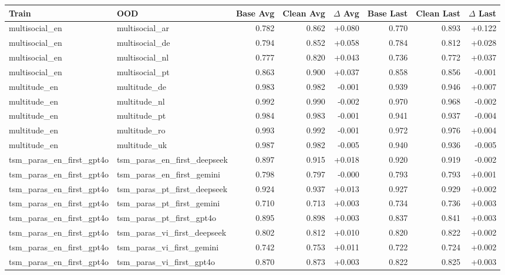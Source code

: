 \begin{table}[t]
\centering
\small
\begin{tabular}{llrrrrrr}
\hline
Train & OOD & Base Avg & Clean Avg & $\Delta$ Avg & Base Last & Clean Last & $\Delta$ Last \\
\hline
multisocial\_en & multisocial\_ar & 0.782 & 0.862 & +0.080 & 0.770 & 0.893 & +0.122 \\
multisocial\_en & multisocial\_de & 0.794 & 0.852 & +0.058 & 0.784 & 0.812 & +0.028 \\
multisocial\_en & multisocial\_nl & 0.777 & 0.820 & +0.043 & 0.736 & 0.772 & +0.037 \\
multisocial\_en & multisocial\_pt & 0.863 & 0.900 & +0.037 & 0.858 & 0.856 & -0.001 \\
multitude\_en & multitude\_de & 0.983 & 0.982 & -0.001 & 0.939 & 0.946 & +0.007 \\
multitude\_en & multitude\_nl & 0.992 & 0.990 & -0.002 & 0.970 & 0.968 & -0.002 \\
multitude\_en & multitude\_pt & 0.984 & 0.983 & -0.001 & 0.941 & 0.937 & -0.004 \\
multitude\_en & multitude\_ro & 0.993 & 0.992 & -0.001 & 0.972 & 0.976 & +0.004 \\
multitude\_en & multitude\_uk & 0.987 & 0.982 & -0.005 & 0.940 & 0.936 & -0.005 \\
tsm\_paras\_en\_first\_gpt4o & tsm\_paras\_en\_first\_deepseek & 0.897 & 0.915 & +0.018 & 0.920 & 0.919 & -0.002 \\
tsm\_paras\_en\_first\_gpt4o & tsm\_paras\_en\_first\_gemini & 0.798 & 0.797 & -0.000 & 0.793 & 0.793 & +0.001 \\
tsm\_paras\_en\_first\_gpt4o & tsm\_paras\_pt\_first\_deepseek & 0.924 & 0.937 & +0.013 & 0.927 & 0.929 & +0.002 \\
tsm\_paras\_en\_first\_gpt4o & tsm\_paras\_pt\_first\_gemini & 0.710 & 0.713 & +0.003 & 0.734 & 0.736 & +0.003 \\
tsm\_paras\_en\_first\_gpt4o & tsm\_paras\_pt\_first\_gpt4o & 0.895 & 0.898 & +0.003 & 0.837 & 0.841 & +0.003 \\
tsm\_paras\_en\_first\_gpt4o & tsm\_paras\_vi\_first\_deepseek & 0.802 & 0.812 & +0.010 & 0.820 & 0.822 & +0.002 \\
tsm\_paras\_en\_first\_gpt4o & tsm\_paras\_vi\_first\_gemini & 0.742 & 0.753 & +0.011 & 0.722 & 0.724 & +0.002 \\
tsm\_paras\_en\_first\_gpt4o & tsm\_paras\_vi\_first\_gpt4o & 0.870 & 0.873 & +0.003 & 0.822 & 0.825 & +0.003 \\

\end{tabular}
\end{table}
